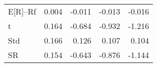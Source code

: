 \begin{tabular}{lrrrr}
\toprule
\midrule
E[R]--Rf & 0.004 & -0.011 & -0.013 & -0.016 \\
t & 0.164 & -0.684 & -0.932 & -1.216 \\
Std & 0.166 & 0.126 & 0.107 & 0.104 \\
SR & 0.154 & -0.643 & -0.876 & -1.144 \\
\bottomrule
\end{tabular}
